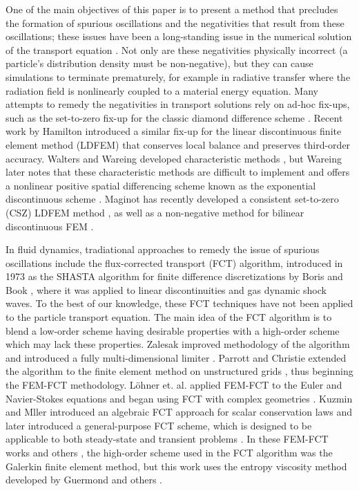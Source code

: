 One of the main objectives of this paper is to present a method that precludes
the formation of spurious oscillations and the negativities that result from
these oscillations; these issues have been a long-standing issue in the
numerical solution of the transport equation \cite{lanthrop}.
Not only are these negativities physically incorrect
(a particle's distribution density must be non-negative), but they can cause
simulations to terminate prematurely, for example in radiative transfer where
the radiation field is nonlinearly coupled to a material energy equation.
Many attempts to remedy the negativities in
transport solutions rely on ad-hoc fix-ups, such as the set-to-zero fix-up for the
classic diamond difference scheme \cite{lewis}. Recent work by Hamilton
introduced a similar fix-up for the linear discontinuous finite element
method (LDFEM) that conserves local balance and preserves third-order accuracy.
Walters and Wareing developed characteristic methods \cite{walters_NC}, but
Wareing later notes that these characteristic methods are difficult to
implement and offers a nonlinear positive spatial differencing scheme
known as the exponential discontinuous scheme \cite{wareing}.
Maginot has recently developed a consistent set-to-zero (CSZ) LDFEM
method \cite{maginot}, as well as a non-negative method for bilinear
discontinuous FEM \cite{maginot_mc2015}. 

In fluid dynamics, tradiational approaches to remedy the issue of spurious oscillations include
the flux-corrected transport (FCT) algorithm, introduced in 1973 as
the SHASTA algorithm for finite difference discretizations
by Boris and Book \cite{borisbook}, where it was applied to linear discontinuities
and gas dynamic shock waves. To the best of our knowledge, these FCT techniques have not been
applied to the particle transport equation.
The main idea of the FCT algorithm is to blend a
low-order scheme having desirable properties with a high-order scheme which may
lack these properties.
Zalesak improved methodology of the algorithm and introduced a fully
multi-dimensional limiter \cite{zalesak}.
Parrott and Christie extended the algorithm to the finite element method
on unstructured grids \cite{parrott}, thus beginning the FEM-FCT methodology.
L\"{o}hner et. al. applied FEM-FCT to the Euler and Navier-Stokes equations and
began using FCT with complex geometries \cite{lohner}.
Kuzmin and Mller introduced an algebraic FCT approach for scalar conservation
laws \cite{kuzmin_FCT} and later introduced a general-purpose FCT scheme, which
is designed to be applicable to both steady-state and transient problems \cite{kuzmin_general}.
In these FEM-FCT works and others \cite{moller_2008,kuzmin_failsafe,kuzmin_closepacking},
the high-order scheme used in the FCT algorithm was the Galerkin finite element
method, but this work uses the entropy viscosity method developed by Guermond
and others \cite{guermond_ev}.


